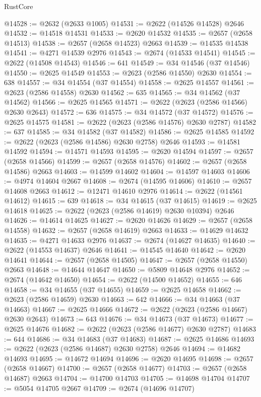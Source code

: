 \begin{lexlean}{RustCore}
\begin{coremodule}
@14528 := @2632 (@2633 @1005)
@14531 := @2622 (@14526 @14528) @2646
@14532 := @14518 @14531
@14533 := @2620 @14532
@14535 := @2657 (@2658 @14513)
@14538 := @2657 (@2658 @14523) @2663
@14539 := @14535 @14538
@14541 := @4271 @14539 @2976
@14543 := @2674 (@14533 @14541)
@14545 := @2622 (@14508 @14543)
@14546 := 641
@14549 := @34 @14546 (@37 @14546)
@14550 := @2625 @14549
@14553 := @2623 (@2586 @14550) @2630
@14554 := 638
@14557 := @34 @14554 (@37 @14554)
@14558 := @2625 @14557
@14561 := @2623 (@2586 @14558) @2630
@14562 := 635
@14565 := @34 @14562 (@37 @14562)
@14566 := @2625 @14565
@14571 := @2622 (@2623 (@2586 @14566) @2630 @2643)
@14572 := 636
@14575 := @34 @14572 (@37 @14572)
@14576 := @2625 @14575
@14581 := @2622 (@2623 (@2586 @14576) @2630 @2787)
@14582 := 637
@14585 := @34 @14582 (@37 @14582)
@14586 := @2625 @14585
@14592 := @2622 (@2623 (@2586 @14586) @2630 @2758) @2646
@14593 := @14581 @14592
@14594 := @14571 @14593
@14595 := @2620 @14594
@14597 := @2657 (@2658 @14566)
@14599 := @2657 (@2658 @14576)
@14602 := @2657 (@2658 @14586) @2663
@14603 := @14599 @14602
@14604 := @14597 @14603
@14606 := @4974 @14604 @2667
@14608 := @2674 (@14595 @14606)
@14610 := @2657 @14608 @2663
@14612 := @12471 @14610 @2976
@14614 := @2622 (@14561 @14612)
@14615 := 639
@14618 := @34 @14615 (@37 @14615)
@14619 := @2625 @14618
@14625 := @2622 (@2623 (@2586 @14619) @2630 @10394) @2646
@14626 := @14614 @14625
@14627 := @2620 @14626
@14629 := @2657 (@2658 @14558)
@14632 := @2657 (@2658 @14619) @2663
@14633 := @14629 @14632
@14635 := @4271 @14633 @2976
@14637 := @2674 (@14627 @14635)
@14640 := @2622 (@14553 @14637) @2646
@14641 := @14545 @14640
@14642 := @2620 @14641
@14644 := @2657 (@2658 @14505)
@14647 := @2657 (@2658 @14550) @2663
@14648 := @14644 @14647
@14650 := @5809 @14648 @2976
@14652 := @2674 (@14642 @14650)
@14654 := @2622 (@14500 @14652)
@14655 := 646
@14658 := @34 @14655 (@37 @14655)
@14659 := @2625 @14658
@14662 := @2623 (@2586 @14659) @2630
@14663 := 642
@14666 := @34 @14663 (@37 @14663)
@14667 := @2625 @14666
@14672 := @2622 (@2623 (@2586 @14667) @2630 @2643)
@14673 := 643
@14676 := @34 @14673 (@37 @14673)
@14677 := @2625 @14676
@14682 := @2622 (@2623 (@2586 @14677) @2630 @2787)
@14683 := 644
@14686 := @34 @14683 (@37 @14683)
@14687 := @2625 @14686
@14693 := @2622 (@2623 (@2586 @14687) @2630 @2758) @2646
@14694 := @14682 @14693
@14695 := @14672 @14694
@14696 := @2620 @14695
@14698 := @2657 (@2658 @14667)
@14700 := @2657 (@2658 @14677)
@14703 := @2657 (@2658 @14687) @2663
@14704 := @14700 @14703
@14705 := @14698 @14704
@14707 := @5054 @14705 @2667
@14709 := @2674 (@14696 @14707)

\end{coremodule}
\end{lexlean}
